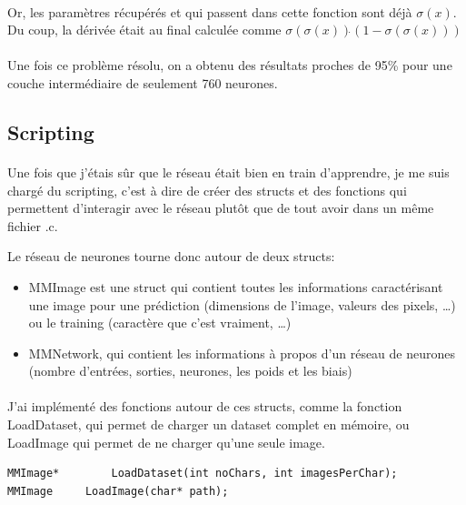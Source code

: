 \documentclass{article}
\begin{document}
\paragraph{}Or, les paramètres récupérés et qui passent dans cette fonction sont déjà $\sigma(x)$. Du coup, la dérivée était au final calculée comme $\sigma(\sigma(x))\dot{}(1 - \sigma(\sigma(x)))$

\paragraph{}Une fois ce problème résolu, on a obtenu des résultats proches de 95\% pour une couche intermédiaire de seulement 760 neurones.


\subsection{Scripting}

\paragraph{}Une fois que j'étais sûr que le réseau était bien en train d'apprendre, je me suis chargé du scripting, c'est à dire de créer des structs et des fonctions qui permettent d'interagir avec le réseau plutôt que de tout avoir dans un même fichier .c.

Le réseau de neurones tourne donc autour de deux structs: 

\begin{itemize}
	\item MMImage est une struct qui contient toutes les informations caractérisant une image pour une prédiction (dimensions de l'image, valeurs des pixels, …) ou le training (caractère que c'est vraiment, …)
	\item MMNetwork, qui contient les informations à propos d'un réseau de neurones (nombre d'entrées, sorties, neurones, les poids et les biais)
\end{itemize}

\paragraph{}J'ai implémenté des fonctions autour de ces structs, comme la fonction LoadDataset, qui permet de charger un dataset complet en mémoire, ou LoadImage qui permet de ne charger qu'une seule image.

\begin{lstlisting}
MMImage*		LoadDataset(int noChars, int imagesPerChar);
MMImage		LoadImage(char* path);
\end{lstlisting}
\end{document}
